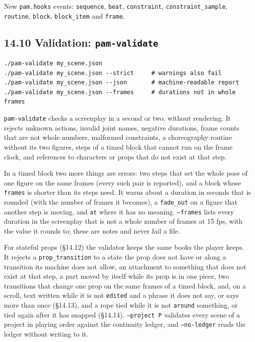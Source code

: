 \documentclass[
  12pt,
  letterpaper,
]{book}
\begin{document}
New \texttt{pam.hooks} events: \texttt{sequence}, \texttt{beat},
\texttt{constraint}, \texttt{constraint\_sample}, \texttt{routine},
\texttt{block}, \texttt{block\_item} and \texttt{frame}.

\subsection{\texorpdfstring{14.10 Validation: \texttt{pam-validate}}{14.10 Validation: pam-validate}}\label{pam-validate}

\begin{verbatim}
./pam-validate my_scene.json
./pam-validate my_scene.json --strict     # warnings also fail
./pam-validate my_scene.json --json       # machine-readable report
./pam-validate my_scene.json --frames     # durations not in whole frames
\end{verbatim}

\texttt{pam-validate} checks a screenplay in a second or two, without
rendering. It rejects unknown actions, invalid joint names, negative
durations, frame counts that are not whole numbers, malformed
constraints, a choreography routine without its two figures, steps of a
timed block that cannot run on the frame clock, and references to
characters or props that do not exist at that step.

In a timed block two more things are errors: two steps that set the
whole pose of one figure on the same frames (every such pair is
reported), and a block whose \texttt{frames} is shorter than its steps
need. It warns about a duration in seconds that is rounded (with the
number of frames it becomes), a \texttt{fade\_out} on a figure that
another step is moving, and \texttt{at} where it has no meaning.
\texttt{--frames} lists every duration in the screenplay that is not a
whole number of frames at 15 fps, with the value it rounds to; these
are notes and never fail a file.

For stateful props (\S14.12) the validator keeps the same books the
player keeps. It rejects a \texttt{prop\_transition} to a state the
prop does not have or along a transition its machine does not allow, an
attachment to something that does not exist at that step, a part moved
by itself while its prop is in one piece, two transitions that change
one prop on the same frames of a timed block, and, on a scroll, text
written while it is not \texttt{edited} and a phrase it does not say,
or says more than once (\S14.13), and a rope tied while it is not
\texttt{around} something, or tied again after it has snapped
(\S14.14).
\texttt{--project P} validates every scene of a project in playing
order against the continuity ledger, and \texttt{--no-ledger} reads the
ledger without writing to it.
\end{document}

